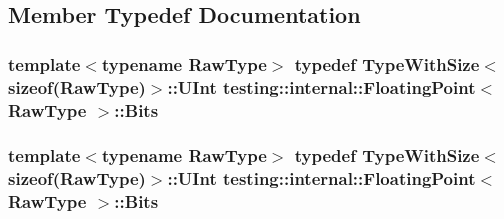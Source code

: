\subsection{Member Typedef Documentation}
\hypertarget{classtesting_1_1internal_1_1_floating_point_abf228bf6cd48f12c8b44c85b4971a731}{
\subsubsection[{Bits}]{\setlength{\rightskip}{0pt plus 5cm}template$<$typename Raw\-Type$>$ typedef {\bf Type\-With\-Size}$<$sizeof(Raw\-Type)$>$\-::U\-Int {\bf testing\-::internal\-::\-Floating\-Point}$<$ Raw\-Type $>$\-::{\bf Bits}}}\label{classtesting_1_1internal_1_1_floating_point_abf228bf6cd48f12c8b44c85b4971a731}
\hypertarget{classtesting_1_1internal_1_1_floating_point_abf228bf6cd48f12c8b44c85b4971a731}{
\subsubsection[{Bits}]{\setlength{\rightskip}{0pt plus 5cm}template$<$typename Raw\-Type$>$ typedef {\bf Type\-With\-Size}$<$sizeof(Raw\-Type)$>$\-::U\-Int {\bf testing\-::internal\-::\-Floating\-Point}$<$ Raw\-Type $>$\-::{\bf Bits}}}\label{classtesting_1_1internal_1_1_floating_point_abf228bf6cd48f12c8b44c85b4971a731}


